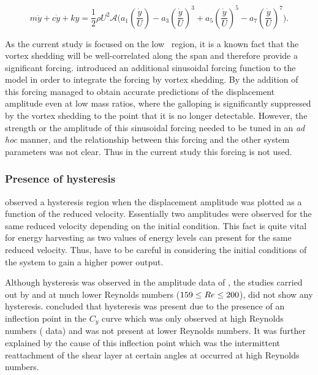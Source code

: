 \begin{equation}
\label{final_equation_motion}
m\ddot{y}{+}c\dot{y}{+}ky{=}\frac{1}{2}\rho U^2 \mathcal {A} \Bigg(a_1\left(\frac{\dot{y}}{U}\right){-}a_3\left(\frac{\dot{y}}{U}\right)^3{+}a_5\left(\frac{\dot{y}}{U}\right)^5{-}a_7\left(\frac{\dot{y}}{U}\right)^7 \Bigg).
\end{equation}

As the current study is focused on the low \reynoldsnumber\ region, it is a known fact that the vortex shedding will be well-correlated along the span and therefore provide a significant forcing. \citet{Joly2012} introduced an additional sinusoidal forcing function to the model in order to integrate the forcing by vortex shedding. By the addition of this forcing \citet{Joly2012} managed to obtain accurate predictions of the displacement amplitude even at low mass ratios, where the galloping is significantly suppressed by the vortex shedding to the point that it is no longer detectable. However, the strength or the amplitude of this sinusoidal forcing needed to be tuned in an \emph{ad hoc} manner, and the relationship between this forcing and the other system parameters was not clear. Thus in the current study this forcing is not used.


\subsubsection*{Presence of hysteresis}


\cite{Parkinson1964} observed a hysteresis region when the displacement amplitude was plotted as a function of the reduced velocity. Essentially two amplitudes were observed for the same reduced velocity depending on the initial condition. This fact is quite vital for energy harvesting as two values of energy levels can present for the same reduced velocity. Thus, have to be careful in considering the initial conditions of the system to gain a higher power output.  

Although hysteresis was observed in the amplitude data of \cite{Parkinson1964}, the studies carried out by \citet{Barrero-Gil2009} and \citet{Joly2012} at much lower Reynolds numbers ($159\leq Re\leq 200$), did not show any hysteresis. \citet{Luo2003} concluded that hysteresis was present due to the presence of an inflection point in the $C_y$ curve which was only observed at high Reynolds numbers (\citet{Parkinson1964} data) and was not present at lower Reynolds numbers. It was further explained by \citet{Luo2003} the cause of this inflection point which was the intermittent reattachment of the shear layer at certain angles at occurred at high Reynolds numbers.   
 
